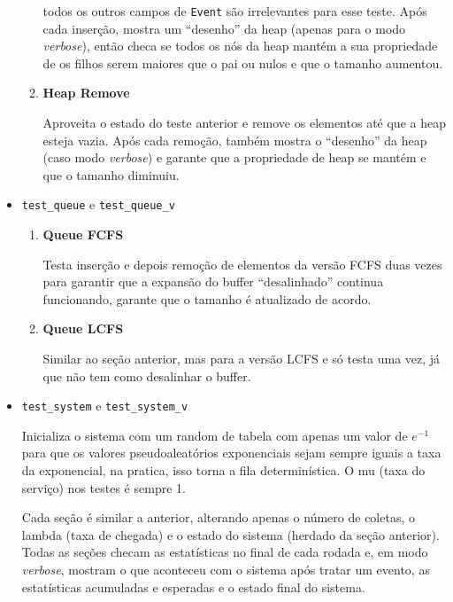 \documentclass[a4paper]{article}
\newcommand{\inlcode}{\texttt}
\begin{document}
\begin{itemize}
\begin{enumerate}
                todos os outros campos de \inlcode{Event}
                são irrelevantes para esse teste.
                Após cada inserção, mostra um ``desenho'' da heap
                (apenas para o modo \emph{verbose}),
                então checa se todos os nós da heap mantém
                a sua propriedade de os filhos serem maiores
                que o pai ou nulos
                e que o tamanho aumentou.
            \item \textbf{Heap Remove} \par
                Aproveita o estado do teste anterior
                e remove os elementos até que a heap esteja vazia.
                Após cada remoção, também
                mostra o ``desenho'' da heap
                (caso modo \emph{verbose})
                e garante que a propriedade de heap se mantém
                e que o tamanho diminuiu.
        \end{enumerate}
    \item \inlcode{test\_queue} e \inlcode{test\_queue\_v}
        \begin{enumerate}
            \item \textbf{Queue FCFS} \par
                Testa inserção e depois remoção de elementos
                da versão FCFS
                duas vezes para garantir
                que a expansão do buffer ``desalinhado''
                continua funcionando,
                garante que o tamanho é atualizado de acordo.
            \item \textbf{Queue LCFS} \par
                Similar ao seção anterior,
                mas para a versão LCFS
                e só testa uma vez,
                já que não tem como desalinhar o buffer.
        \end{enumerate}
    \item \inlcode{test\_system} e \inlcode{test\_system\_v} \par
        Inicializa o sistema com um random de tabela com
        apenas um valor de \(e^{-1}\) para que
        os valores pseudoaleatórios exponenciais
        sejam sempre iguais a taxa da exponencial,
        na pratica, isso torna a fila determinística.
        O mu (taxa do serviço) nos testes é sempre 1.

        Cada seção é similar a anterior,
        alterando apenas o número de coletas,
        o lambda (taxa de chegada) e
        o estado do sistema (herdado da seção anterior).
        Todas as seções
        checam as estatísticas no final de cada rodada
        e, em modo \emph{verbose},
        mostram o que aconteceu com o sistema após tratar um evento,
        as estatísticas acumuladas e esperadas e
        o estado final do sistema.


\end{itemize}
\end{document}
